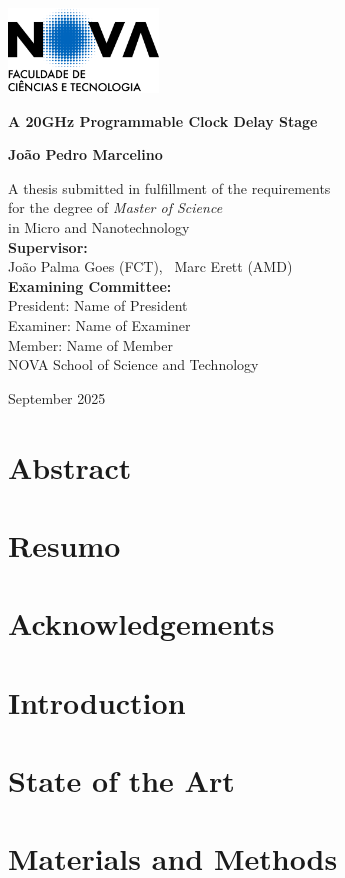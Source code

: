 \documentclass[11pt, a4paper]{report}
\newcommand{\importsection}[1]{}
\newcommand{\frontpage}{
    \begin{titlepage}
        \centering
        \includegraphics[width=0.3\textwidth]{figures/university-logo.png}\\ %
        \vspace{2cm}
        {\Huge\bfseries A 20GHz Programmable Clock Delay Stage\par}
        \vspace{1.5cm}
        {\Large\bfseries João Pedro Marcelino\par}
        \vfill
        A thesis submitted in fulfillment of the requirements\\
        for the degree of \emph{Master of Science}\\
        in Micro and Nanotechnology\\
        \vspace{2cm}
        {\bfseries Supervisor:}\\[0.5em]
        João Palma Goes (FCT), \
        Marc Erett (AMD)\\[2cm]
        {\bfseries Examining Committee:}\\[0.5em]
        President: Name of President\\
        Examiner: Name of Examiner\\
        Member: Name of Member\\[2cm]
        NOVA School of Science and Technology\\
        \vspace{1cm}
        {\large September 2025\par}
    \end{titlepage}
}
\newcommand{\copyrightpage}{
    \thispagestyle{empty}
    \vspace*{0.1\textheight} %
    \importsection{copyright} %
    \cleardoublepage
}
\begin{document}
\frontpage%
\thispagestyle{empty}

\copyrightpage


\chapter*{Abstract}
\importsection{abstract} %
\cleardoublepage %

\chapter*{Resumo}
\importsection{resumo} %
\cleardoublepage %

\chapter*{Acknowledgements}
\importsection{acknowledgements}


\tableofcontents
\cleardoublepage

\listoffigures
\cleardoublepage

\listoftables
\cleardoublepage
{}


\setcounter{page}{1}

\chapter{Introduction}
\importsection{introduction}
\cleardoublepage

\chapter{State of the Art}
\importsection{stateoftheart}
\cleardoublepage

\chapter{Materials and Methods}
\importsection{methods}
\cleardoublepage
\end{document}
